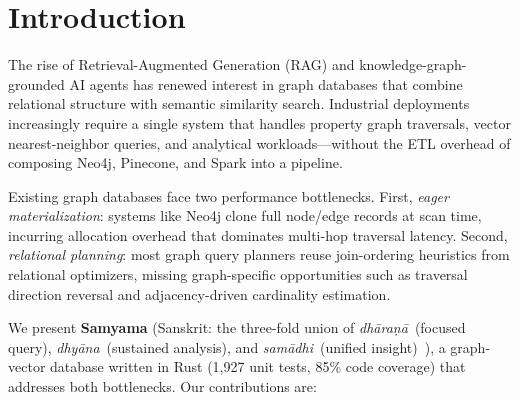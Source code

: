 \documentclass[sigconf, nonacm]{acmart}
\begin{document}
\maketitle

\section{Introduction}
\label{sec:intro}

The rise of Retrieval-Augmented Generation (RAG) and knowledge-graph-grounded AI agents has renewed interest in graph databases that combine relational structure with semantic similarity search.
Industrial deployments increasingly require a single system that handles property graph traversals, vector nearest-neighbor queries, and analytical workloads---without the ETL overhead of composing Neo4j, Pinecone, and Spark into a pipeline.

Existing graph databases face two performance bottlenecks.
First, \emph{eager materialization}: systems like Neo4j clone full node/edge records at scan time, incurring allocation overhead that dominates multi-hop traversal latency.
Second, \emph{relational planning}: most graph query planners reuse join-ordering heuristics from relational optimizers, missing graph-specific opportunities such as traversal direction reversal and adjacency-driven cardinality estimation.

We present \textbf{Samyama} (Sanskrit: the three-fold union of \emph{dh\=ara\d{n}\=a}~(focused query), \emph{dhy\=ana}~(sustained analysis), and \emph{sam\=adhi}~(unified insight)~\cite{isha_samyama}), a graph-vector database written in Rust (1,927 unit tests, 85\% code coverage) that addresses both bottlenecks. Our contributions are:
\end{document}
